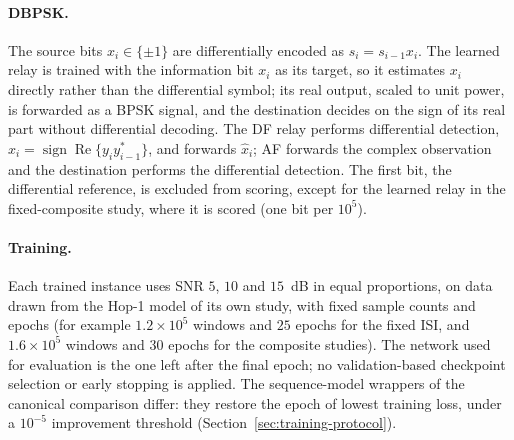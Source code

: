 \paragraph{DBPSK.} The source bits $x_i \in \{\pm1\}$ are differentially encoded as $s_i = s_{i-1}x_i$. The learned relay is trained with the information bit $x_i$ as its target, so it estimates $x_i$ directly rather than the differential symbol; its real output, scaled to unit power, is forwarded as a BPSK signal, and the destination decides on the sign of its real part without differential decoding. The DF relay performs differential detection, $\hat{x}_i = \operatorname{sign}\operatorname{Re}\{y_i y_{i-1}^{*}\}$, and forwards $\hat{x}_i$; AF forwards the complex observation and the destination performs the differential detection. The first bit, the differential reference, is excluded from scoring, except for the learned relay in the fixed-composite study, where it is scored (one bit per $10^{5}$).

\paragraph{Training.} Each trained instance uses SNR $5$, $10$ and $15$~dB in equal proportions, on data drawn from the Hop-1 model of its own study, with fixed sample counts and epochs (for example $1.2\times10^{5}$ windows and $25$ epochs for the fixed ISI, and $1.6\times10^{5}$ windows and $30$ epochs for the composite studies). The network used for evaluation is the one left after the final epoch; no validation-based checkpoint selection or early stopping is applied. The sequence-model wrappers of the canonical comparison differ: they restore the epoch of lowest training loss, under a $10^{-5}$ improvement threshold (Section~\ref{sec:training-protocol}).

